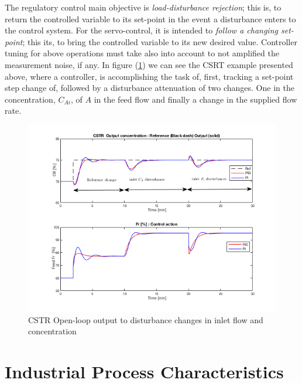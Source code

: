 The regulatory control main objective is \emph{load-disturbance rejection}; this is, to return the controlled variable to its set-point in the event a disturbance enters to the control system.  For the servo-control, it is intended to \emph{follow a changing set-point}; this its, to bring the controlled variable to its new desired value. Controller tuning for above operations must take also into account to not amplified the measurement noise, if any.  In figure (\ref{Ch2fig:CSTRFigureClosedLoop}) we can see the CSRT example presented above, where a controller, is accomplishing the task of, first, tracking a set-point step change of, followed by a disturbance attenuation  of two changes. One  in the concentration, $C_{Ai}$, of $A$ in the feed flow and finally a change in the supplied flow rate.

\begin{figure}[tb]
\centering
\includegraphics[width=0.9\linewidth]{../figuras/Ch2FigureClosedLoop}
\caption{CSTR Open-loop output to disturbance changes in inlet flow and concentration} 
\label{Ch2fig:CSTRFigureClosedLoop}
\end{figure}


\section{Industrial Process Characteristics}
\label{sec:2}

